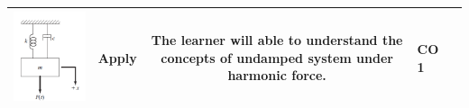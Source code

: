 \documentclass[11pt,paper=a4,answers]{exam}
\begin{document}
\begin{flushleft}
\begin{longtable}{|>{\centering\arraybackslash}p{0.8cm}  | >{\raggedright\arraybackslash}p{6.5cm}  | c | >{\raggedright\arraybackslash}p{5cm} |>{\centering\arraybackslash}p{1cm}|}
		\includegraphics[scale=0.6]{4.png} &	Apply&	The learner will able to understand the concepts of undamped system under harmonic force.&	CO 1\\
		\hline 
		

\end{longtable}
\end{flushleft}
\end{document}

